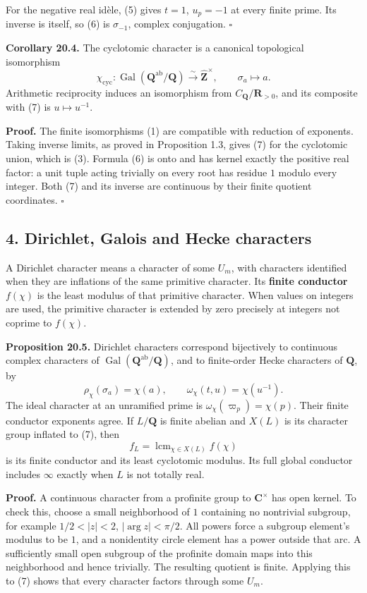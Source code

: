 \documentclass[11pt,a4paper]{article}
\begin{document}
For the negative real idèle, (5) gives \(t=1\), \(u_p=-1\) at every
finite prime. Its inverse is itself, so (6) is \(\sigma_{-1}\), complex
conjugation. \(\square\)

\textbf{Corollary 20.4.} The cyclotomic character is a canonical
topological isomorphism \[
\chi_{\mathrm{cyc}}:\operatorname{Gal}(\mathbf Q^{\mathrm{ab}}/\mathbf Q)
\xrightarrow{\sim}\widehat{\mathbf Z}^{\times},
\qquad \sigma_a\longmapsto a.
\tag{7}
\] Arithmetic reciprocity induces an isomorphism from
\(C_{\mathbf Q}/\mathbf R_{>0}\), and its composite with (7) is
\(u\mapsto u^{-1}\).

\textbf{Proof.} The finite isomorphisms (1) are compatible with
reduction of exponents. Taking inverse limits, as proved in Proposition
1.3, gives (7) for the cyclotomic union, which is (3). Formula (6) is
onto and has kernel exactly the positive real factor: a unit tuple
acting trivially on every root has residue \(1\) modulo every integer.
Both (7) and its inverse are continuous by their finite quotient
coordinates. \(\square\)

\subsection{4. Dirichlet, Galois and Hecke
characters}\label{dirichlet-galois-and-hecke-characters}

A Dirichlet character means a character of some \(U_m\), with characters
identified when they are inflations of the same primitive character. Its
\textbf{finite conductor} \(f(\chi)\) is the least modulus of that
primitive character. When values on integers are used, the primitive
character is extended by zero precisely at integers not coprime to
\(f(\chi)\).

\textbf{Proposition 20.5.} Dirichlet characters correspond bijectively
to continuous complex characters of
\(\operatorname{Gal}(\mathbf Q^{\mathrm{ab}}/\mathbf Q)\), and to
finite-order Hecke characters of \(\mathbf Q\), by \[
\rho_\chi(\sigma_a)=\chi(a),\qquad
\omega_\chi(t,u)=\chi(u^{-1}).
\tag{8}
\] The ideal character at an unramified prime is
\(\omega_\chi(\varpi_p)=\chi(p)\). Their finite conductor exponents
agree. If \(L/\mathbf Q\) is finite abelian and \(X(L)\) is its
character group inflated to (7), then \[
f_L=\operatorname{lcm}_{\chi\in X(L)}f(\chi)
\tag{9}
\] is its finite conductor and its least cyclotomic modulus. Its full
global conductor includes \(\infty\) exactly when \(L\) is not totally
real.

\textbf{Proof.} A continuous character from a profinite group to
\(\mathbf C^\times\) has open kernel. To check this, choose a small
neighborhood of \(1\) containing no nontrivial subgroup, for example
\(1/2<|z|<2\), \(|\arg z|<\pi/2\). All powers force a subgroup element's
modulus to be \(1\), and a nonidentity circle element has a power
outside that arc. A sufficiently small open subgroup of the profinite
domain maps into this neighborhood and hence trivially. The resulting
quotient is finite. Applying this to (7) shows that every character
factors through some \(U_m\).
\end{document}
